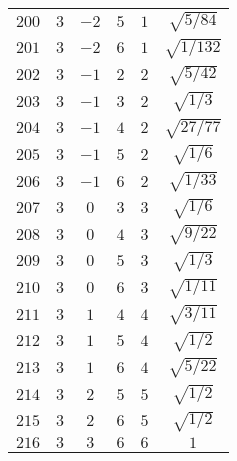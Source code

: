 \begin{table}
\begin{center}
\begin{tabular}{|c|c|c|c|c|c|}
$200$ & $3$ & $-2$ & $5$ & $1$ & $\sqrt{5/84}$ \\ 
$201$ & $3$ & $-2$ & $6$ & $1$ & $\sqrt{1/132}$ \\ 
$202$ & $3$ & $-1$ & $2$ & $2$ & $\sqrt{5/42}$ \\ 
$203$ & $3$ & $-1$ & $3$ & $2$ & $\sqrt{1/3}$ \\ 
$204$ & $3$ & $-1$ & $4$ & $2$ & $\sqrt{27/77}$ \\ 
$205$ & $3$ & $-1$ & $5$ & $2$ & $\sqrt{1/6}$ \\ 
$206$ & $3$ & $-1$ & $6$ & $2$ & $\sqrt{1/33}$ \\ 
$207$ & $3$ & $0$ & $3$ & $3$ & $\sqrt{1/6}$ \\ 
$208$ & $3$ & $0$ & $4$ & $3$ & $\sqrt{9/22}$ \\ 
$209$ & $3$ & $0$ & $5$ & $3$ & $\sqrt{1/3}$ \\ 
$210$ & $3$ & $0$ & $6$ & $3$ & $\sqrt{1/11}$ \\ 
$211$ & $3$ & $1$ & $4$ & $4$ & $\sqrt{3/11}$ \\ 
$212$ & $3$ & $1$ & $5$ & $4$ & $\sqrt{1/2}$ \\ 
$213$ & $3$ & $1$ & $6$ & $4$ & $\sqrt{5/22}$ \\ 
$214$ & $3$ & $2$ & $5$ & $5$ & $\sqrt{1/2}$ \\ 
$215$ & $3$ & $2$ & $6$ & $5$ & $\sqrt{1/2}$ \\ 
$216$ & $3$ & $3$ & $6$ & $6$ & $1$ \\ 
\hline 
\end{tabular}
\end{center}
\end{table}


